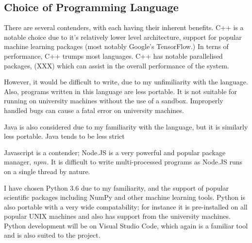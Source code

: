 \documentclass[12pt,a4paper]{article}
\begin{document}


\subsection*{Choice of Programming Language}

There are several contenders, with each having their inherent benefits. C++ is a notable choice due to it's relatively lower level architecture, support for popular machine learning packages (most notably Google's TensorFlow.) In terns of performance, C++ trumps most languages. C++ has notable parallelised packages, (XXX) which can assist in the overall performance of the system. 

However, it would be difficult to write, due to my unfimiliarity with the language. Also, programs written in this language are less portable. It is not suitable for running on university machines without the use of a sandbox. Improperly handled bugs can cause a fatal error on university machines.

Java is also considered due to my familiarity with the language, but it is similarly less portable. Java tends to be less strict

Javascript is a contender; Node.JS is a very powerful and popular package manager, $npm$. It is difficult to write multi-processed programs as Node.JS runs on a single thread by nature. 


I have chosen Python 3.6 due to my familiarity, and the support of popular scientific packages including NumPy and other machine learning tools. Python is also portable with a very wide compatability; for instance it is pre-installed on all popular UNIX machines and also has support from the university machines. Python development will be on Visual Studio Code, which again is a familiar tool and is also suited to the project.
\end{document}
